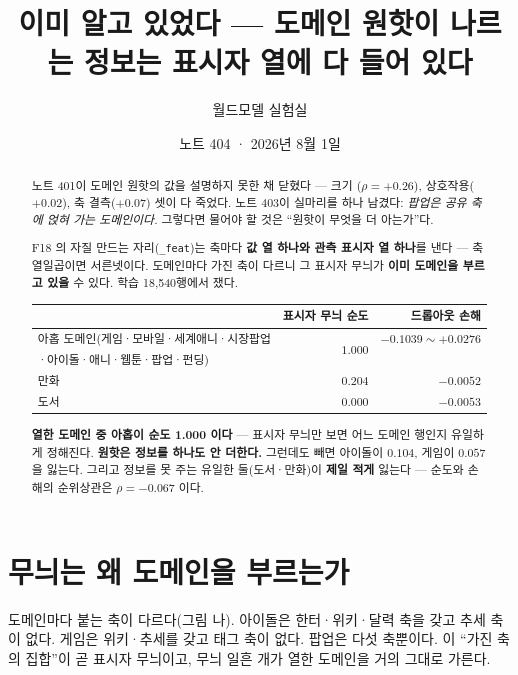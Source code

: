 \documentclass[11pt]{article}
\begin{document}
\title{이미 알고 있었다 --- 도메인 원핫이 나르는 정보는 표시자 열에 다 들어 있다}
\author{월드모델 실험실}
\date{노트 404 · 2026년 8월 1일}
\maketitle

\begin{abstract}
노트 401이 도메인 원핫의 값을 설명하지 못한 채 닫혔다 --- 크기
($\rho{=}{+}0.26$), 상호작용($+0.02$), 축 결측($+0.07$) 셋이 다 죽었다.
노트 403이 실마리를 하나 남겼다: \emph{팝업은 공유 축에 얹혀 가는
도메인이다.} 그렇다면 물어야 할 것은 ``원핫이 무엇을 더 아는가''다.

F18 의 자질 만드는 자리(\texttt{\_feat})는 축마다 \textbf{값 열 하나와
관측 표시자 열 하나}를 낸다 --- 축 열일곱이면 서른넷이다. 도메인마다 가진
축이 다르니 그 표시자 무늬가 \textbf{이미 도메인을 부르고 있을} 수 있다.
학습 18{,}540행에서 쟀다.

\begin{center}
\begin{tabular}{lrr}
\hline
 & 표시자 무늬 순도 & 드롭아웃 손해 \\
\hline
아홉 도메인(게임·모바일·세계애니·시장팝업 & \multirow{2}{*}{$\mathbf{1.000}$}
 & $-0.1039 \sim +0.0276$ \\
\quad ·아이돌·애니·웹툰·팝업·펀딩) & & \\
\hline
만화 & $0.204$ & $-0.0052$ \\
도서 & $\mathbf{0.000}$ & $-0.0053$ \\
\hline
\end{tabular}
\end{center}

\textbf{열한 도메인 중 아홉이 순도 1.000 이다} --- 표시자 무늬만 보면 어느
도메인 행인지 유일하게 정해진다. \textbf{원핫은 정보를 하나도 안 더한다.}
그런데도 빼면 아이돌이 $0.104$, 게임이 $0.057$ 을 잃는다. 그리고 정보를
못 주는 유일한 둘(도서·만화)이 \textbf{제일 적게} 잃는다 --- 순도와 손해의
순위상관은 $\rho = -0.067$ 이다.
\end{abstract}

\section{무늬는 왜 도메인을 부르는가}

도메인마다 붙는 축이 다르다(그림 나). 아이돌은 한터·위키·달력 축을 갖고
추세 축이 없다. 게임은 위키·추세를 갖고 태그 축이 없다. 팝업은 다섯 축뿐이다.
이 ``가진 축의 집합''이 곧 표시자 무늬이고, 무늬 일흔 개가 열한 도메인을
거의 그대로 가른다.
\end{document}
